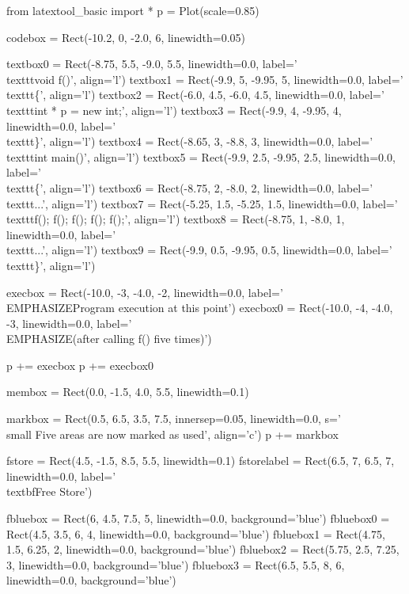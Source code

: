 \begin{python}
from latextool_basic import *
p = Plot(scale=0.85)

codebox = Rect(-10.2, 0, -2.0, 6, linewidth=0.05)

textbox0 = Rect(-8.75, 5.5, -9.0, 5.5, linewidth=0.0, label='\\texttt{void f()}', align='l')
textbox1 = Rect(-9.9, 5, -9.95, 5, linewidth=0.0, label='\\texttt{\{}', align='l')
textbox2 = Rect(-6.0, 4.5, -6.0, 4.5, linewidth=0.0, label='\\texttt{int * p = new int;}', align='l')
textbox3 = Rect(-9.9, 4, -9.95, 4, linewidth=0.0, label='\\texttt{\}}', align='l')
textbox4 = Rect(-8.65, 3, -8.8, 3, linewidth=0.0, label='\\texttt{int main()}', align='l')
textbox5 = Rect(-9.9, 2.5, -9.95, 2.5, linewidth=0.0, label='\\texttt{\{}', align='l')
textbox6 = Rect(-8.75, 2, -8.0, 2, linewidth=0.0, label='\\texttt{...}', align='l')
textbox7 = Rect(-5.25, 1.5, -5.25, 1.5, linewidth=0.0, label='\\texttt{f(); f(); f(); f(); f();}', align='l')
textbox8 = Rect(-8.75, 1, -8.0, 1, linewidth=0.0, label='\\texttt{...}', align='l')
textbox9 = Rect(-9.9, 0.5, -9.95, 0.5, linewidth=0.0, label='\\texttt{\}}', align='l')

execbox = Rect(-10.0, -3, -4.0, -2, linewidth=0.0,
               label='\\EMPHASIZE{Program execution at this point}')
execbox0 = Rect(-10.0, -4, -4.0, -3, linewidth=0.0,
               label='\\EMPHASIZE{(after calling f() five times)}')

p += execbox
p += execbox0

membox = Rect(0.0, -1.5, 4.0, 5.5, linewidth=0.1)

markbox = Rect(0.5, 6.5, 3.5, 7.5, innersep=0.05, linewidth=0.0, s='{\\small Five areas are now marked as used}', align='c')
p += markbox

fstore = Rect(4.5, -1.5, 8.5, 5.5, linewidth=0.1)
fstorelabel = Rect(6.5, 7, 6.5, 7, linewidth=0.0, label='\\textbf{Free Store}')

fbluebox = Rect(6, 4.5, 7.5, 5, linewidth=0.0, background='blue')
fbluebox0 = Rect(4.5, 3.5, 6, 4, linewidth=0.0, background='blue')
fbluebox1 = Rect(4.75, 1.5, 6.25, 2, linewidth=0.0, background='blue')
fbluebox2 = Rect(5.75, 2.5, 7.25, 3, linewidth=0.0, background='blue')
fbluebox3 = Rect(6.5, 5.5, 8, 6, linewidth=0.0, background='blue')
          

\end{python}
